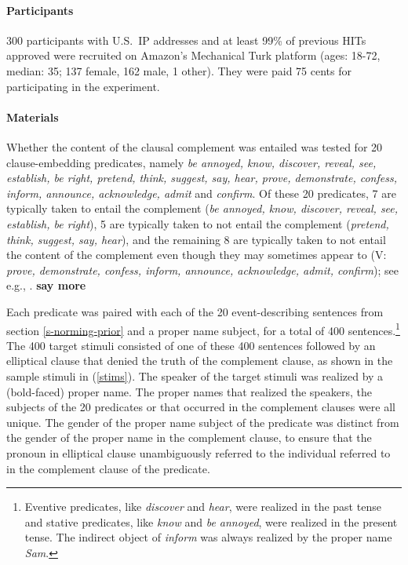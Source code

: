 \documentclass[11pt,fleqn]{article}
\newcommand{\6}{\mbox{$[\hspace*{-.6mm}[$}}
\newcommand{\9}{\mbox{$]\hspace*{-.6mm}]$}}
\begin{document}
\paragraph{Participants} 300 participants with U.S.\ IP addresses and at least 99\% of previous HITs approved were recruited on Amazon's Mechanical Turk platform (ages: 18-72, median: 35; 137 female, 162 male, 1 other). They were paid 75 cents for participating in the experiment.

\paragraph{Materials} Whether the content of the clausal complement was entailed was tested for 20 clause-embedding predicates, namely {\em be annoyed, know, discover, reveal, see, establish, be right, pretend, think, suggest, say, hear, prove, demonstrate, confess, inform, announce, acknowledge, admit} and {\em confirm}. Of these 20 predicates, 7 are typically taken to entail the complement ({\em be annoyed, know, discover, reveal, see, establish, be right}), 5 are typically taken to not entail the complement ({\em pretend, think, suggest, say, hear}), and the remaining 8 are typically taken to not entail the content of the complement even though they may sometimes appear to (V: {\em prove, demonstrate, confess, inform, announce, acknowledge, admit, confirm}); see e.g., \citealt{schlenker10,swanson2012,anand-hacquard2014}. {\bf say more}

Each predicate was paired with each of the 20 event-describing sentences from section \ref{s-norming-prior} and a proper name subject, for a total of 400 sentences.\footnote{Eventive predicates, like {\em discover} and {\em hear}, were realized in the past tense and stative predicates, like {\em know} and {\em be annoyed}, were realized in the present tense. The indirect object of {\em inform} was always realized by the proper name {\em Sam}.} The 400 target stimuli consisted of one of these 400 sentences followed by an elliptical clause that denied the truth of the complement clause, as shown in the sample stimuli in (\ref{stims}). The speaker of the target stimuli was realized by a (bold-faced) proper name. The proper names that realized the speakers, the subjects of the 20 predicates or that occurred in the complement clauses were all unique. The gender of the proper name subject of the predicate was distinct from the gender of the proper name in the complement clause, to ensure that the pronoun in elliptical clause unambiguously referred to the individual referred to in the complement clause of the predicate.
\end{document}
